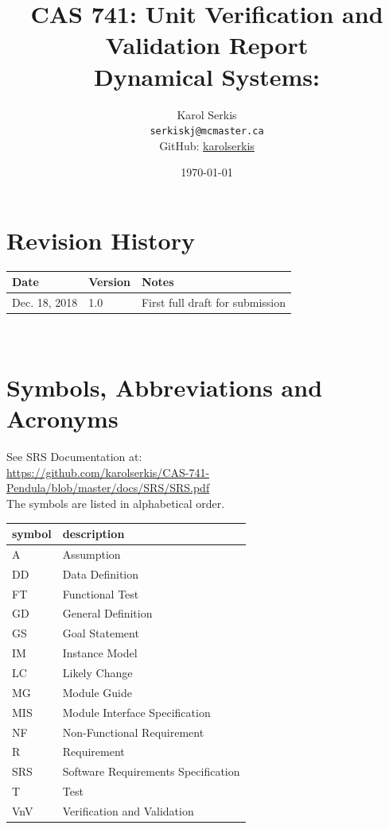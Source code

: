 \documentclass[12pt, titlepage]{article}
\begin{document}
\title{CAS 741: Unit Verification and Validation Report\\[10pt]
\Large Dynamical Systems: \progname}
\author{Karol Serkis\\\texttt{serkiskj@mcmaster.ca}\\GitHub:
\href{https://www.github.com/karolserkis}{karolserkis}}
\date{\today}
	
\maketitle


\section{Revision History}

\begin{tabularx}{\textwidth}{p{3cm}p{2cm}X}
\toprule {\bf Date} & {\bf Version} & {\bf Notes}\\
\midrule
Dec. 18, 2018 & 1.0 &  First full draft for submission\\
\bottomrule
\end{tabularx}

~\newpage


\section{Symbols, Abbreviations and Acronyms}

See SRS Documentation at:\\
\url{https://github.com/karolserkis/CAS-741-Pendula/blob/master/docs/SRS/SRS.pdf}\\
The symbols are listed in alphabetical order.\\

\renewcommand{\arraystretch}{1.2}
\begin{tabular}{l l} 
  \toprule		
  \textbf{symbol} & \textbf{description}\\
  \midrule 
  A & Assumption\\
  DD & Data Definition\\
  FT & Functional Test \\
  GD & General Definition\\
  GS & Goal Statement\\
  IM & Instance Model\\
  LC & Likely Change\\
  MG & Module Guide\\ 
  MIS & Module Interface Specification\\ 
  NF & Non-Functional Requirement\\
  R & Requirement\\
  SRS & Software Requirements Specification\\
  T & Test\\
  VnV & Verification and Validation\\ 
  \bottomrule
\end{tabular}\\
\end{document}
